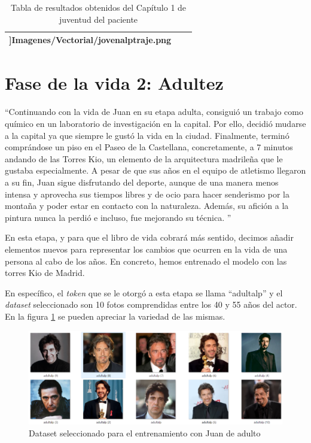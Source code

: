 \begin{table}
\begin{tabular}{>{\centering\arraybackslash}m{5cm} >{\arraybackslash}m{5cm}>{\arraybackslash}m{5cm}}
 		\textwidth]{Imagenes/Vectorial/jovenalptraje.png}\\
 		\hline
 	\end{tabular}
 	\caption{Tabla de resultados obtenidos del Capítulo 1 de juventud del paciente}
 	\label{tab:capitulo1librovida}
 \end{table}


\section{Fase de la vida 2: Adultez}
``Continuando con la vida de Juan en su etapa adulta, consiguió un trabajo como químico en un laboratorio de investigación en la capital. Por ello, decidió mudarse a la capital ya que siempre le gustó la vida en la ciudad. Finalmente, terminó comprándose un piso en el Paseo de la Castellana, concretamente, a 7 minutos andando de las Torres Kio, un elemento de la arquitectura madrileña que le gustaba especialmente. A pesar de que sus años en el equipo de atletismo llegaron a su fin, Juan sigue disfrutando del deporte, aunque de una manera menos intensa y aprovecha sus tiempos libres y de ocio para hacer senderismo por la montaña y poder estar en contacto con la naturaleza. Además, su afición a la pintura nunca la perdió e incluso, fue mejorando su técnica. '' 

En esta etapa, y para que el libro de vida cobrará más sentido, decimos añadir elementos nuevos para representar los cambios que ocurren en la vida de una persona al cabo de los años. En concreto, hemos entrenado el modelo con las torres Kio de Madrid.

En específico, el \textit{token} que se le otorgó a esta etapa se llama ``adultalp'' y el \textit{dataset} seleccionado son 10 fotos comprendidas entre los 40 y 55 años del actor. En la figura \ref{fig:datasetadultalp} se pueden apreciar la variedad de las mismas. 

\begin{figure}[!htb]
	\centering
	\includegraphics[width = 1
	\textwidth]{Imagenes/Vectorial/dataset_adultalp.png}
	\caption{Dataset seleccionado para el entrenamiento con Juan de adulto}
	\label{fig:datasetadultalp}
\end{figure}

